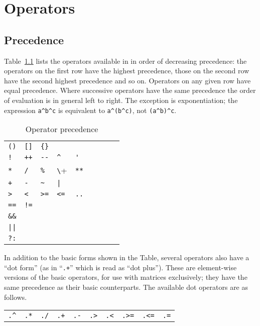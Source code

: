 \chapter{Operators}
\label{chap:operators}

\section{Precedence}

Table~\ref{tab:ops} lists the operators available in  in
order of decreasing precedence: the operators on the first row have
the highest precedence, those on the second row have the second
highest precedence and so on. Operators on any given row have equal
precedence. Where successive operators have the same precedence the
order of evaluation is in general left to right. The exception is
exponentiation; the expression \verb|a^b^c| is equivalent to
\verb|a^(b^c)|, not \verb|(a^b)^c|.

\begin{table}[htbp]
\caption{Operator precedence}
\label{tab:ops}
\begin{center}
\begin{tabular}{lllllllll}
\verb|()| & \verb|[]| & \verb|{}| \\
\texttt{!} & \texttt{++} & \verb|--| & \verb|^| & \verb|'| \\
\texttt{*} & \texttt{/} & \texttt{\%} & \verb+\+ & \texttt{**} \\
\texttt{+} & \texttt{-} & \verb|~| & \verb+|+ & \\
\verb|>| & \verb|<| & \verb|>=| & \verb|<=| & \texttt{..} \\
\texttt{==} & \texttt{!=} \\
\verb|&&| \\
\verb+||+ \\
\texttt{?:} \\
\end{tabular}
\end{center}
\end{table}

In addition to the basic forms shown in the Table, several operators
also have a ``dot form'' (as in ``\texttt{.+}'' which is read as ``dot
plus''). These are element-wise versions of the basic operators, for
use with matrices exclusively; they have the same precedence as their
basic counterparts. The available dot operators are as follows.

\begin{center}
\begin{tabular}{cccccccccc}
\verb|.^| & \texttt{.*} & \texttt{./} & \texttt{.+} &
 \texttt{.-} & \verb|.>| & \verb|.<| & \verb|.>=| &
 \verb|.<=| & \texttt{.=} \\
\end{tabular}
\end{center}

